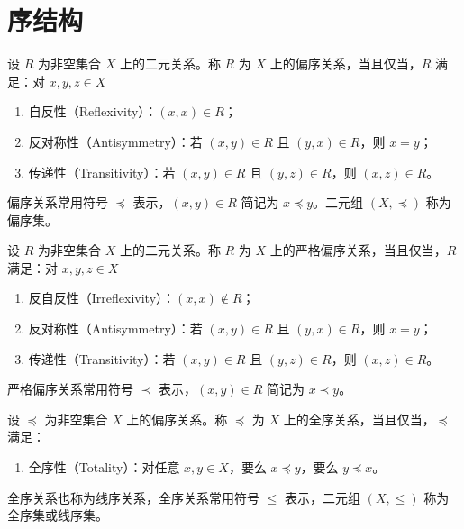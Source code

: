 \section{序结构}

\begin{definition}
    设 $ R $ 为非空集合 $X$ 上的二元关系。称 $ R $ 为 $ X $ 上的偏序关系，当且仅当，$ R $ 满足：对 $ x,y,z\in X $
    \begin{enumerate}
        \item 自反性（Reflexivity）：$ (x,x)\in R $；
        \item 反对称性（Antisymmetry）：若 $ (x,y)\in R $ 且 $ (y,x)\in R $，则 $ x=y $；
        \item 传递性（Transitivity）：若 $ (x,y)\in R $ 且 $ (y,z)\in R $，则 $ (x,z)\in R $。
    \end{enumerate}
    偏序关系常用符号 $ \preceq $ 表示，$ (x,y)\in R $ 简记为 $ x\preceq y $。二元组 $ (X,\preceq) $ 称为偏序集。
\end{definition}
\vspace{1em}

\begin{definition}
    设 $ R $ 为非空集合 $X$ 上的二元关系。称 $ R $ 为 $ X $ 上的严格偏序关系，当且仅当，$ R $ 满足：对 $ x,y,z\in X $
    \begin{enumerate}
        \item 反自反性（Irreflexivity）：$ (x,x)\notin R $；
        \item 反对称性（Antisymmetry）：若 $ (x,y)\in R $ 且 $ (y,x)\in R $，则 $ x=y $；
        \item 传递性（Transitivity）：若 $ (x,y)\in R $ 且 $ (y,z)\in R $，则 $ (x,z)\in R $。
    \end{enumerate}
    严格偏序关系常用符号 $ \prec $ 表示，$ (x,y)\in R $ 简记为 $ x\prec y $。
\end{definition}
\vspace{1em}

\begin{definition}
    设 $ \preceq $ 为非空集合 $X$ 上的偏序关系。称 $ \preceq $ 为 $ X $ 上的全序关系，当且仅当，$ \preceq $ 满足：
    \begin{enumerate}
        \item 全序性（Totality）：对任意 $ x,y\in X $，要么 $ x \preceq y $，要么 $ y\preceq x $。
    \end{enumerate}
    全序关系也称为线序关系，全序关系常用符号 $ \leq $ 表示，二元组 $ (X,\leq) $ 称为全序集或线序集。
\end{definition}

